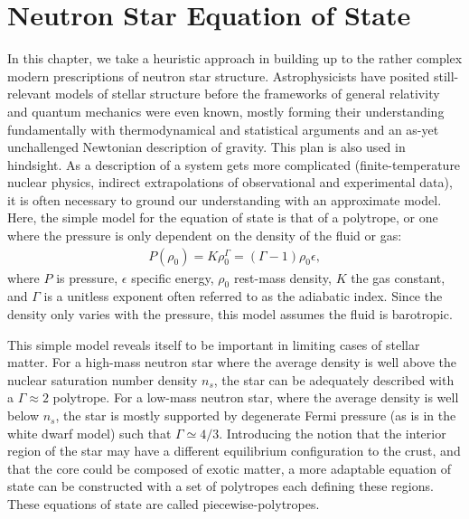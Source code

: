 \chapter{Neutron Star Equation of State}
\label{chap:chapter-2}

In this chapter, we take a heuristic approach in building up to the rather complex modern prescriptions of neutron star structure. 
Astrophysicists have posited still-relevant models of stellar structure before the frameworks of general relativity and quantum mechanics were even known, mostly forming their understanding fundamentally with thermodynamical and statistical arguments and an as-yet unchallenged Newtonian description of gravity.
This plan is also used in hindsight.
As a description of a system gets more complicated (finite-temperature nuclear physics, indirect extrapolations of observational and experimental data), it is often necessary to ground our understanding with an approximate model.
Here, the simple model for the equation of state is that of a polytrope, or one where the pressure is only dependent on the density of the fluid or gas:
\begin{align}
P(\rho_0) = K \rho_0^\Gamma = (\Gamma -  1) \rho_0 \epsilon,
\end{align}
where $P$ is pressure, $\epsilon$ specific energy, $\rho_0$ rest-mass density, $K$ the gas constant, and $\Gamma$ is a unitless exponent often referred to as the adiabatic index.
Since the density only varies with the pressure, this model assumes the fluid is barotropic.

This simple model reveals itself to be important in limiting cases of stellar matter.  
For a high-mass neutron star where the average density is well above the nuclear saturation number density $n_s$, the star can be adequately described with a $\Gamma \approx 2$ polytrope.  
For a low-mass neutron star, where the average density is well below $n_s$, the star is mostly supported by degenerate Fermi pressure (as is in the white dwarf model) such that $\Gamma \simeq 4/3$.
Introducing the notion that the interior region of the star may have a different equilibrium configuration to the crust, and that the core could be composed of exotic matter, a more adaptable equation of state can be constructed with a set of polytropes each defining these regions.  
These equations of state are called piecewise-polytropes.  

